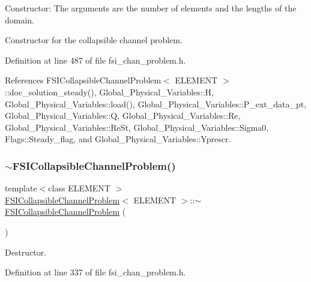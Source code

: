 Constructor\+: The arguments are the number of elements and the lengths of the domain. 

Constructor for the collapsible channel problem. 

Definition at line 487 of file fsi\+\_\+chan\+\_\+problem.\+h.



References F\+S\+I\+Collapsible\+Channel\+Problem$<$ E\+L\+E\+M\+E\+N\+T $>$\+::doc\+\_\+solution\+\_\+steady(), Global\+\_\+\+Physical\+\_\+\+Variables\+::H, Global\+\_\+\+Physical\+\_\+\+Variables\+::load(), Global\+\_\+\+Physical\+\_\+\+Variables\+::\+P\+\_\+ext\+\_\+data\+\_\+pt, Global\+\_\+\+Physical\+\_\+\+Variables\+::Q, Global\+\_\+\+Physical\+\_\+\+Variables\+::\+Re, Global\+\_\+\+Physical\+\_\+\+Variables\+::\+Re\+St, Global\+\_\+\+Physical\+\_\+\+Variables\+::\+Sigma0, Flags\+::\+Steady\+\_\+flag, and Global\+\_\+\+Physical\+\_\+\+Variables\+::\+Yprescr.

\mbox{\label{classFSICollapsibleChannelProblem_abe33aaaae15ea3eb10885527a1d1ad9a}} 
\subsubsection{\texorpdfstring{$\sim$\+F\+S\+I\+Collapsible\+Channel\+Problem()}{~FSICollapsibleChannelProblem()}}
{\footnotesize\ttfamily template$<$class E\+L\+E\+M\+E\+NT $>$ \\
\hyperlink{classFSICollapsibleChannelProblem}{F\+S\+I\+Collapsible\+Channel\+Problem}$<$ E\+L\+E\+M\+E\+NT $>$\+::$\sim$\hyperlink{classFSICollapsibleChannelProblem}{F\+S\+I\+Collapsible\+Channel\+Problem} (\begin{DoxyParamCaption}{ }\end{DoxyParamCaption})\hspace{0.3cm}{\ttfamily [inline]}}



Destructor. 



Definition at line 337 of file fsi\+\_\+chan\+\_\+problem.\+h.



